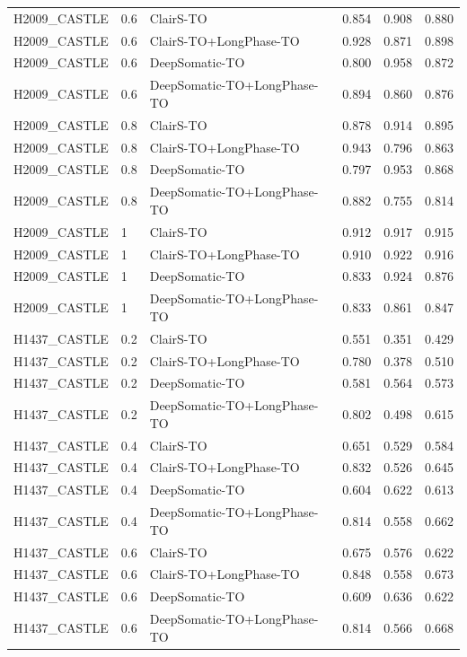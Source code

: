 \documentclass[pdflatex,sn-nature]{sn-jnl}
\begin{document}
{\begin{longtable}{@{}lllccc@{}}
  H2009\_CASTLE & 0.6 & ClairS-TO & 0.854 & 0.908 & 0.880 \\
  H2009\_CASTLE & 0.6 & ClairS-TO+LongPhase-TO & 0.928 & 0.871 & 0.898 \\
  H2009\_CASTLE & 0.6 & DeepSomatic-TO & 0.800 & 0.958 & 0.872 \\
  H2009\_CASTLE & 0.6 & DeepSomatic-TO+LongPhase-TO & 0.894 & 0.860 & 0.876 \\
  H2009\_CASTLE & 0.8 & ClairS-TO & 0.878 & 0.914 & 0.895 \\
  H2009\_CASTLE & 0.8 & ClairS-TO+LongPhase-TO & 0.943 & 0.796 & 0.863 \\
  H2009\_CASTLE & 0.8 & DeepSomatic-TO & 0.797 & 0.953 & 0.868 \\
  H2009\_CASTLE & 0.8 & DeepSomatic-TO+LongPhase-TO & 0.882 & 0.755 & 0.814 \\
  H2009\_CASTLE & 1 & ClairS-TO & 0.912 & 0.917 & 0.915 \\
  H2009\_CASTLE & 1 & ClairS-TO+LongPhase-TO & 0.910 & 0.922 & 0.916 \\
  H2009\_CASTLE & 1 & DeepSomatic-TO & 0.833 & 0.924 & 0.876 \\
  H2009\_CASTLE & 1 & DeepSomatic-TO+LongPhase-TO & 0.833 & 0.861 & 0.847 \\
  \addlinespace
  H1437\_CASTLE & 0.2 & ClairS-TO & 0.551 & 0.351 & 0.429 \\
  H1437\_CASTLE & 0.2 & ClairS-TO+LongPhase-TO & 0.780 & 0.378 & 0.510 \\
  H1437\_CASTLE & 0.2 & DeepSomatic-TO & 0.581 & 0.564 & 0.573 \\
  H1437\_CASTLE & 0.2 & DeepSomatic-TO+LongPhase-TO & 0.802 & 0.498 & 0.615 \\
  H1437\_CASTLE & 0.4 & ClairS-TO & 0.651 & 0.529 & 0.584 \\
  H1437\_CASTLE & 0.4 & ClairS-TO+LongPhase-TO & 0.832 & 0.526 & 0.645 \\
  H1437\_CASTLE & 0.4 & DeepSomatic-TO & 0.604 & 0.622 & 0.613 \\
  H1437\_CASTLE & 0.4 & DeepSomatic-TO+LongPhase-TO & 0.814 & 0.558 & 0.662 \\
  H1437\_CASTLE & 0.6 & ClairS-TO & 0.675 & 0.576 & 0.622 \\
  H1437\_CASTLE & 0.6 & ClairS-TO+LongPhase-TO & 0.848 & 0.558 & 0.673 \\
  H1437\_CASTLE & 0.6 & DeepSomatic-TO & 0.609 & 0.636 & 0.622 \\
  H1437\_CASTLE & 0.6 & DeepSomatic-TO+LongPhase-TO & 0.814 & 0.566 & 0.668 \\

\end{longtable}}
\end{document}
